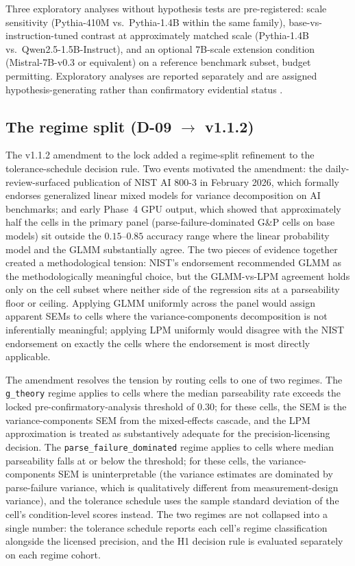 \documentclass[11pt]{article}
\begin{document}
Three exploratory analyses without hypothesis tests are pre-registered:
scale sensitivity (Pythia-410M vs.\ Pythia-1.4B within the same
family), base-vs-instruction-tuned contrast at approximately
matched scale (Pythia-1.4B vs.\ Qwen2.5-1.5B-Instruct), and an
optional $7$B-scale extension condition (Mistral-7B-v0.3 or
equivalent) on a reference benchmark subset, budget permitting.
Exploratory analyses are reported separately and are assigned
hypothesis-generating rather than confirmatory evidential status
\citep{anonymized2026n134}.

\subsection{The regime split (D-09 \(\to\) v1.1.2)}
\label{sec:design-regime-split}
\label{sec:regime-split-design}

The v1.1.2 amendment to the lock added a regime-split refinement
to the tolerance-schedule decision rule. Two events motivated the
amendment: the daily-review-surfaced publication of NIST AI 800-3
\citep{nist2026statmodels} in February 2026, which formally endorses
generalized linear mixed models for variance decomposition on AI
benchmarks; and early Phase~4 GPU output, which showed that
approximately half the cells in the primary panel
(parse-failure-dominated G\&P cells on base models) sit outside the
$0.15$--$0.85$ accuracy range where the linear probability model
and the GLMM substantially agree. The two pieces of evidence
together created a methodological tension: NIST's endorsement
recommended GLMM as the methodologically meaningful choice, but the
GLMM-vs-LPM agreement holds only on the cell subset where neither
side of the regression sits at a parseability floor or ceiling.
Applying GLMM uniformly across the panel would assign apparent
SEMs to cells where the variance-components decomposition is not
inferentially meaningful; applying LPM uniformly would
disagree with the NIST endorsement on exactly the cells where the
endorsement is most directly applicable.

The amendment resolves the tension by routing cells to one of two
regimes. The \texttt{g\_theory} regime applies to cells where the
median parseability rate exceeds the locked
pre-confirmatory-analysis threshold of $0.30$; for these cells, the SEM is the variance-components SEM
from the mixed-effects cascade, and the LPM approximation is
treated as substantively adequate for the precision-licensing
decision. The \texttt{parse\_failure\_dominated} regime
applies to cells where median parseability falls at or below the
threshold; for these cells, the variance-components SEM is
uninterpretable (the variance estimates are dominated by
parse-failure variance, which is qualitatively different from
measurement-design variance), and the tolerance schedule uses the
sample standard deviation of the cell's condition-level scores
instead. The two regimes are not collapsed into a single number:
the tolerance schedule reports each cell's regime classification
alongside the licensed precision, and the H1 decision rule is
evaluated separately on each regime cohort.
\end{document}
